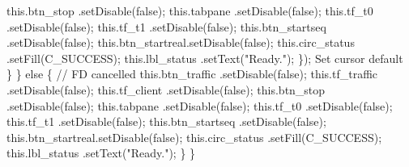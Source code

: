         this.btn_stop     .setDisable(false);
        this.tabpane      .setDisable(false);
        this.tf_t0        .setDisable(false);
        this.tf_t1        .setDisable(false);
        this.btn_startseq .setDisable(false);
        this.btn_startreal.setDisable(false);
        this.circ_status  .setFill(C_SUCCESS);
        this.lbl_status   .setText("Ready.");
      \});
      \LA{}Set cursor default~{\nwtagstyle{}}\RA{}
    \}
  \} else \{
    // FD cancelled
    this.btn_traffic  .setDisable(false);
    this.tf_traffic   .setDisable(false);
    this.tf_client    .setDisable(false);
    this.btn_stop     .setDisable(false);
    this.tabpane      .setDisable(false);
    this.tf_t0        .setDisable(false);
    this.tf_t1        .setDisable(false);
    this.btn_startseq .setDisable(false);
    this.btn_startreal.setDisable(false);
    this.circ_status  .setFill(C_SUCCESS);
    this.lbl_status   .setText("Ready.");
  \}
\}
\nwendcode{}\nwdocspar

